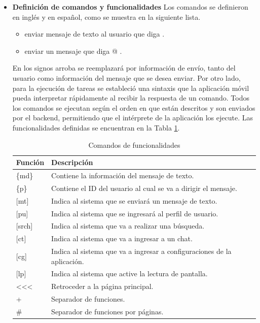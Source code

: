 \documentclass[lettersize,journal]{IEEEtran}
\begin{document}
\begin{itemize}
	\item \textbf{Definición de comandos y funcionalidades} 
	Los comandos se definieron en inglés y en español, como se muestra en la siguiente lista.
	
	\begin{itemize}
		\item enviar mensaje de texto al usuario \@ que diga \@.  
		\item enviar un mensaje que diga @ .  
	\end{itemize}
	
	En los signos arroba se reemplazará por información de envío, tanto del usuario como información del mensaje que se desea enviar. 
	Por otro lado, para la ejecución de tareas se estableció una sintaxis que la aplicación móvil pueda interpretar rápidamente al recibir la respuesta de un comando. Todos los comandos se ejecutan según el orden en que están descritos y son enviados por el backend, permitiendo que el intérprete de la aplicación los ejecute. Las funcionalidades definidas se encuentran en la Tabla \ref{tab:comandos-funcionalidades}.
	
	\begin{table}[ht]
		\centering
		\caption{Comandos de funcionalidades}
		\label{tab:comandos-funcionalidades}
		\small
		\begin{tabular}{lp{5cm}}
			\toprule
			\textbf{Función} & \textbf{Descripción} \\
			\midrule
			\{md\} & Contiene la información del mensaje de texto. \\
			\{p\} & Contiene el ID del usuario al cual se va a dirigir el mensaje. \\
			{[}mt{]} & Indica al sistema que se enviará un mensaje de texto. \\
			{[}pu{]} & Indica al sistema que se ingresará al perfil de usuario. \\
			{[}srch{]} & Indica al sistema que va a realizar una búsqueda. \\
			{[}ct{]} & Indica al sistema que va a ingresar a un chat. \\
			{[}cg{]} & Indica al sistema que va a ingresar a configuraciones de la aplicación. \\
			{[}lp{]} & Indica al sistema que active la lectura de pantalla. \\
			\textless{}\textless{}\textless{} & Retroceder a la página principal. \\
			+ & Separador de funciones. \\
			\# & Separador de funciones por páginas. \\
			\bottomrule
		\end{tabular}
	\end{table}


\end{itemize}
\end{document}
